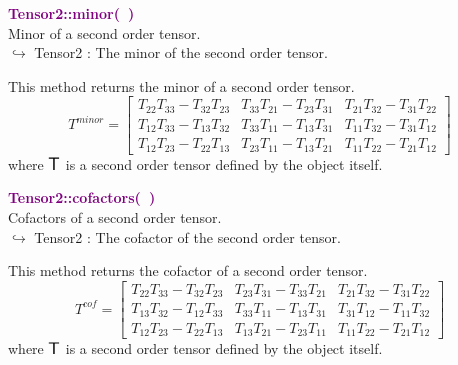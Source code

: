 \textcolor{purple}{\textbf{Tensor2::minor(~)}}\label{Tensor2::minor()}\\
Minor of a second order tensor.\\ \hspace*{10mm}$\hookrightarrow$ Tensor2 : The minor of the second order tensor.

This method returns the minor of a second order tensor.
\begin{equation*}
T^{minor} = \left[\begin{array}{ccc}
T_{22}T_{33}-T_{32}T_{23} & T_{33}T_{21}-T_{23}T_{31} & T_{21}T_{32}-T_{31}T_{22}\\
T_{12}T_{33}-T_{13}T_{32} & T_{33}T_{11}-T_{13}T_{31} & T_{11}T_{32}-T_{31}T_{12}\\
T_{12}T_{23}-T_{22}T_{13} & T_{23}T_{11}-T_{13}T_{21} & T_{11}T_{22}-T_{21}T_{12}
\end{array}
\right]
\end{equation*}
where $\mbox{\large\ensuremath{\mathsf{T}}}$ is a second order tensor defined by the object itself.

\textcolor{purple}{\textbf{Tensor2::cofactors(~)}}\label{Tensor2::cofactors()}\\
Cofactors of a second order tensor.\\ \hspace*{10mm}$\hookrightarrow$ Tensor2 : The cofactor of the second order tensor.

This method returns the cofactor of a second order tensor.
\begin{equation*}
T^{cof} = \left[\begin{array}{ccc}
T_{22}T_{33}-T_{32}T_{23} & T_{23}T_{31}-T_{33}T_{21} & T_{21}T_{32}-T_{31}T_{22}\\
T_{13}T_{32}-T_{12}T_{33} & T_{33}T_{11}-T_{13}T_{31} & T_{31}T_{12}-T_{11}T_{32}\\
T_{12}T_{23}-T_{22}T_{13} & T_{13}T_{21}-T_{23}T_{11} & T_{11}T_{22}-T_{21}T_{12}
\end{array}
\right]
\end{equation*}
where $\mbox{\large\ensuremath{\mathsf{T}}}$ is a second order tensor defined by the object itself.

